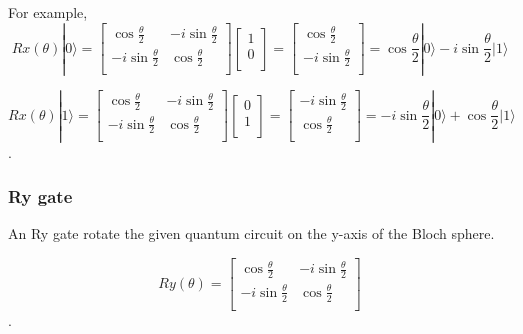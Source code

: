  For example,
 \begin{equation}
 Rx(\theta)|0\rangle = \begin{bmatrix}
\cos{\frac{\theta}{2}} & -i\sin{\frac{\theta}{2}} \\
 -i\sin{\frac{\theta}{2}} & \cos{\frac{\theta}{2}}  \\
\end{bmatrix}\left[
\begin{array}{c}
1 \\
0 \\
\end{array}
\right]
=  \left[
\begin{array}{c}
\cos{\frac{\theta}{2}} \\
-i\sin{\frac{\theta}{2}} \\
\end{array}
\right]
= \cos{\frac{\theta}{2}}|0\rangle -i \sin{\frac{\theta}{2}} |1\rangle
\end{equation}

\begin{equation}
Rx(\theta)|1\rangle = \begin{bmatrix}
\cos{\frac{\theta}{2}} & -i\sin{\frac{\theta}{2}} \\
 -i\sin{\frac{\theta}{2}} & \cos{\frac{\theta}{2}}  \\
\end{bmatrix}\left[
\begin{array}{c}
0 \\
1 \\
\end{array}
\right]
=  \left[
\begin{array}{c}
 -i\sin{\frac{\theta}{2}} \\
\cos{\frac{\theta}{2}}\\
\end{array}
\right]
=-i \sin{\frac{\theta}{2}}|0\rangle + \cos{\frac{\theta}{2}}|1\rangle
\end{equation}.

\subsubsection{Ry gate}

 An Ry gate rotate the given quantum circuit on the y-axis of the Bloch sphere.
 
 \begin{equation}
 Ry(\theta) = \begin{bmatrix}
\cos{\frac{\theta}{2}} & -i\sin{\frac{\theta}{2}} \\
 -i\sin{\frac{\theta}{2}} & \cos{\frac{\theta}{2}}  \\
\end{bmatrix}
\end{equation}.

